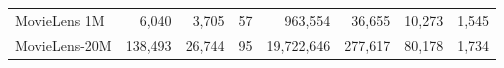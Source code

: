 \begin{table*}[]
{\begin{tabular}{lrrrrrrr}
MovieLens 1M                & 6,040                       & 3,705                       & 57                               & 963,554                                                                   & 36,655                                                                   & 10,273                                                                    & 1,545                                                                    \\
MovieLens-20M                & 138,493                     & 26,744                      & 95                               & 19,722,646                                                                & 277,617                                                                  & 80,178                                                                    & 1,734                                                                    \\\bottomrule
\end{tabular}
}
\label{tab:dataset_table}
\end{table*}
% 

